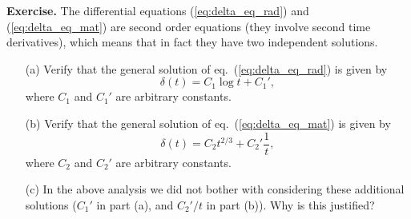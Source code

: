 \documentclass[11pt, a4paper,oneside,openright]{book}
\numberwithin{equation}{section}
\begin{document}
\par\vspace{\baselineskip}

{\bf Exercise.} The differential equations (\ref{eq:delta_eq_rad}) and (\ref{eq:delta_eq_mat}) are second order equations (they involve second time derivatives), which means that in fact they have two independent solutions.
\begin{itemize}
\item [(a)] Verify that the general solution of eq.\ (\ref{eq:delta_eq_rad}) is given by
\begin{equation}
\delta(t)=C_1\log t+C_1',
\end{equation}
where $C_1$ and $C_1'$ are arbitrary constants.
\item [(b)] Verify that the general solution of eq.\ (\ref{eq:delta_eq_mat}) is given by
\begin{equation}
\delta(t)=C_2t^{2/3}+C_2'\frac{1}{t},
\end{equation}
where $C_2$ and $C_2'$ are arbitrary constants.
\item [(c)] In the above analysis we did not bother with considering these additional solutions ($C_1'$ in part (a), and $C_2'/t$ in part (b)). Why is this justified?
\end{itemize}

\par\vspace{\baselineskip}
\end{document}
